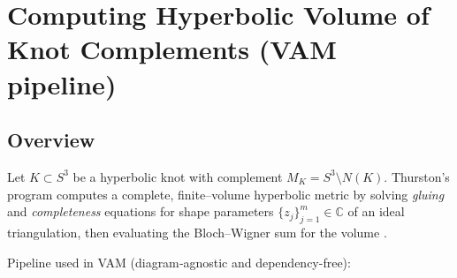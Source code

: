 \documentclass[10pt,reprint,aps,onecolumn,nofootinbib]{revtex4-2}
\begin{document}
    \section{Computing Hyperbolic Volume of Knot Complements (VAM pipeline)}

    \subsection{Overview}
        Let \(K\subset S^3\) be a hyperbolic knot with complement \(M_K = S^3\setminus N(K)\).
        Thurston’s program computes a complete, finite–volume hyperbolic metric by solving \emph{gluing} and \emph{completeness} equations for shape parameters \(\{z_j\}_{j=1}^m\in\mathbb{C}\) of an ideal triangulation, then evaluating the Bloch–Wigner sum for the volume \cite{ThurstonNotes,NeumannZagier1985,AdamsWeeks1992}.

        Pipeline used in VAM (diagram‐agnostic and dependency-free):
\end{document}
